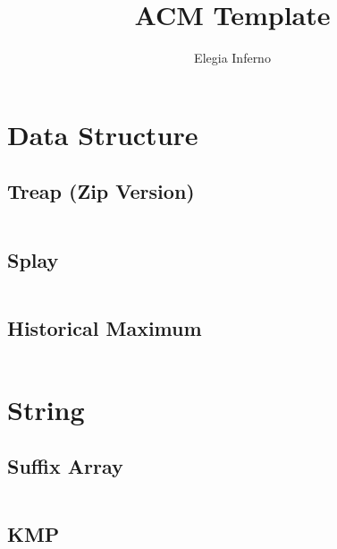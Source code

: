 \documentclass[a4paper, 11pt]{article}   	%
\title{ACM Template}
\author{Elegia Inferno}
\begin{document}
\maketitle

\tableofcontents

\newpage

\section{Data Structure}

\subsection{Treap (Zip Version)}

\inputminted[breaklines, linenos]{cpp}{ds/treap.cpp}

\subsection{Splay}

\inputminted[breaklines, linenos]{cpp}{ds/splay.cpp}

\subsection{Historical Maximum}

\inputminted[breaklines, linenos]{cpp}{ds/hs.cpp}

\section{String}

\subsection{Suffix Array}

\inputminted[breaklines, linenos]{cpp}{str/sa.cpp}

\subsection{KMP}
\end{document}

